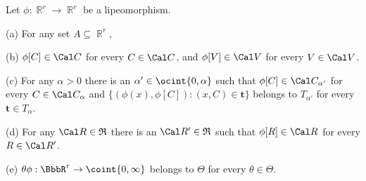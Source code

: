  Let $\phi:\BbbR^r\to\BbbR^r$ be a lipeomorphism.

(a) For any set $A\subseteq\BbbR^r$,


(b) $\phi[C]\in\Cal C$ for every $C\in\Cal C$, and $\phi[V]\in\Cal V$
for every $V\in\Cal V$.

(c) For any $\alpha>0$ there is an $\alpha'\in\ocint{0,\alpha}$ such
that $\phi[C]\in\Cal C_{\alpha'}$ for every $C\in\Cal C_{\alpha}$ and
$\{(\phi(x),\phi[C]):(x,C)\in\pmb{t}\}$ belongs to $T_{\alpha'}$ for
every $\pmb{t}\in T_{\alpha}$.

(d) For any $\Cal R\in\frak R$ there is an $\Cal R'\in\frak R$ such that
$\phi[R]\in\Cal R$ for every $R\in\Cal R'$.

(e) $\theta\phi:\BbbR^r\to\coint{0,\infty}$ belongs to $\Theta$ for
every $\theta\in\Theta$.

